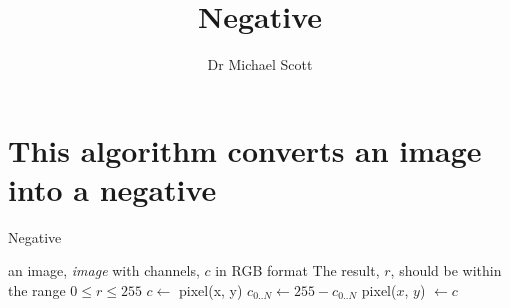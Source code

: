 \documentclass{../../../fal_assignment}
\title{Negative}
\author{Dr Michael Scott}
\begin{document}
\maketitle

	\section{This algorithm converts an image into a negative}
	
	\begin{algorithm}[ht]
	\caption{Negative}
	\label{alg:algorithm}
	
	\begin{algorithmic}[1]
			\Require
			\Statex an image, \textit{image} with channels, $c$ in RGB format
			\Ensure The result, $r$, should be within the range \Statex $0 \leq r \leq 255$
			\State $c \leftarrow $ pixel(x, y)
			\State $c_{0..N} \leftarrow 255 - c_{0..N}$
			\State pixel($x$, $y$) $\leftarrow c$
			\EndFor
			\EndProcedure
	\end{algorithmic}
	
	\end{algorithm}
\end{document}
